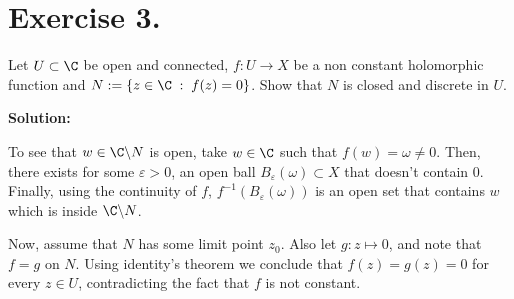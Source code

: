 \section*{Exercise 3.}

Let $U \subset \C$ be open and connected, $f: U \to X$ be a non constant holomorphic function and $N := \{z \in \C \;:\; f(z) = 0\}$. Show that $N$ is closed and discrete in $U$.

\textbf{Solution:}

To see that $w \in \C\backslash N$ is open, take $w \in \C$ such that $f(w) = \omega \neq 0$. Then, there exists for some $\varepsilon > 0$, an open ball $B_\varepsilon(\omega) \subset X$ that doesn't contain $0$. Finally, using the continuity of $f$, $f^{-1}(B_\varepsilon(\omega))$ is an open set that contains $w$ which is inside $\C \backslash N$.

Now, assume that $N$ has some limit point $z_0$. Also let $g: z \mapsto 0$, and note that $f = g$ on $N$. Using identity's theorem we conclude that $f(z) = g(z) = 0$ for every $z\in U$, contradicting the fact that $f$ is not constant.